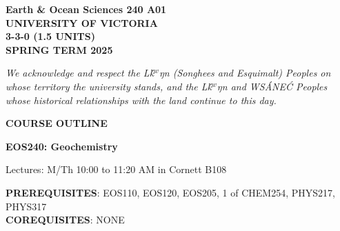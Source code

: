 \documentclass[11pt]{article}
\def\schwa{{\tenipa\char64}}
\begin{document}

%


\hspace*{\fill}\textbf{Earth \& Ocean Sciences 240 A01}\\
\hspace*{\fill}\textbf{UNIVERSITY OF VICTORIA}\\
\hspace*{\fill}\textbf{3-3-0 (1.5 UNITS)}\\
\hspace*{\fill}\textbf{SPRING TERM 2025}\\


\noindent\hrulefill

\begin{center}
\emph{We acknowledge and respect the L\schwa\'k$^w$\schwa ŋ\schwa n (Songhees and Esquimalt) Peoples on whose territory the university stands, and the L\schwa\'k$^w$\schwa ŋ\schwa n and WS\'ANE\'C Peoples whose historical relationships with the land continue to this day.}
\end{center}

\noindent\hrulefill

\begin{center}
\Large \textbf{COURSE OUTLINE}

\Large \textbf{EOS240: Geochemistry}

\normalsize Lectures: M/Th 10:00 to 11:20 AM in Cornett B108  \\
\end{center}

\noindent\hrulefill

\textbf{PREREQUISITES}: EOS110, EOS120, EOS205, 1 of CHEM254, PHYS217, PHYS317\\
\textbf{COREQUISITES}: NONE\\
\end{document}
